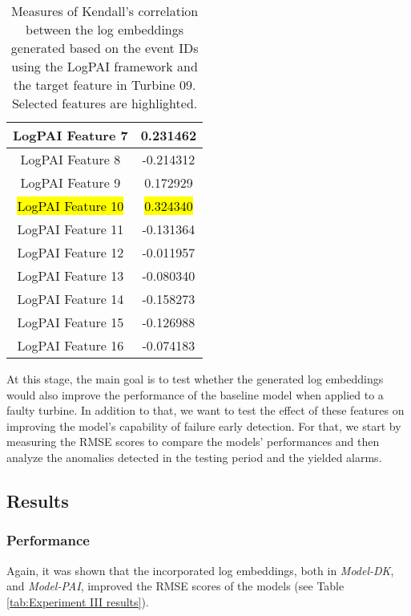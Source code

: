 \begin{table}[h]
{\begin{tabular}{|c|c|}
        \hline
        \multicolumn{1}{|m{0.25\textwidth}|}{LogPAI Feature 7} & 0.231462\\
        \hline
        \multicolumn{1}{|m{0.25\textwidth}|}{LogPAI Feature 8} & -0.214312\\
        \hline
        \multicolumn{1}{|m{0.25\textwidth}|}{LogPAI Feature 9} & 0.172929\\
        \hline
        \multicolumn{1}{|m{0.25\textwidth}|}{\hl{LogPAI Feature 10}} & \hl{0.324340}\\
        \hline
        \multicolumn{1}{|m{0.25\textwidth}|}{LogPAI Feature 11} & -0.131364\\
        \hline
        \multicolumn{1}{|m{0.25\textwidth}|}{LogPAI Feature 12} & -0.011957\\
        \hline
        \multicolumn{1}{|m{0.25\textwidth}|}{LogPAI Feature 13} & -0.080340\\
        \hline
        \multicolumn{1}{|m{0.25\textwidth}|}{LogPAI Feature 14} & -0.158273\\
        \hline
        \multicolumn{1}{|m{0.25\textwidth}|}{LogPAI Feature 15}& -0.126988\\
        \hline
        \multicolumn{1}{|m{0.25\textwidth}|}{LogPAI Feature 16} & -0.074183\\
        \hline
    \end{tabular}
    \caption{Measures of Kendall's correlation between the log embeddings generated based on the event IDs using the LogPAI framework and the target feature in Turbine 09. Selected features are highlighted.}
    \label{tab:expIII:logpai-feats}
    }
    \end{table}

At this stage, the main goal is to test whether the generated log embeddings would also improve the performance of the baseline model when applied to a 
faulty turbine. In addition to that, we want to test the effect of these features on improving the model's capability of failure early detection.
For that, we start by measuring the RMSE scores to compare the models' performances and then analyze the anomalies detected in the testing period 
and the yielded alarms.

\subsection{Results}
\subsubsection{Performance}
Again, it was shown that the incorporated log embeddings, both in \emph{Model-DK}, and \emph{Model-PAI}, improved the RMSE scores of the models (see Table \ref{tab:Experiment III results}). 

